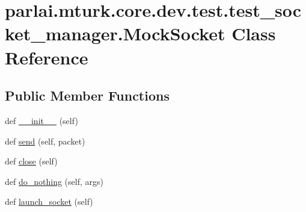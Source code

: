 \hypertarget{classparlai_1_1mturk_1_1core_1_1dev_1_1test_1_1test__socket__manager_1_1MockSocket}{}\section{parlai.\+mturk.\+core.\+dev.\+test.\+test\+\_\+socket\+\_\+manager.\+Mock\+Socket Class Reference}
\label{classparlai_1_1mturk_1_1core_1_1dev_1_1test_1_1test__socket__manager_1_1MockSocket}
\subsection*{Public Member Functions}
\begin{DoxyCompactItemize}
\item 
def \hyperlink{classparlai_1_1mturk_1_1core_1_1dev_1_1test_1_1test__socket__manager_1_1MockSocket_aae84c6558084a2a830cafc4f6954daec}{\+\_\+\+\_\+init\+\_\+\+\_\+} (self)
\item 
def \hyperlink{classparlai_1_1mturk_1_1core_1_1dev_1_1test_1_1test__socket__manager_1_1MockSocket_a16b8427d524e1681fbf16bd9f6a76ee1}{send} (self, packet)
\item 
def \hyperlink{classparlai_1_1mturk_1_1core_1_1dev_1_1test_1_1test__socket__manager_1_1MockSocket_aa0bc2ba7bc5787378324f76c4f3e4101}{close} (self)
\item 
def \hyperlink{classparlai_1_1mturk_1_1core_1_1dev_1_1test_1_1test__socket__manager_1_1MockSocket_a22ac3f879f60f110608f38e7e48c3bd1}{do\+\_\+nothing} (self, args)
\item 
def \hyperlink{classparlai_1_1mturk_1_1core_1_1dev_1_1test_1_1test__socket__manager_1_1MockSocket_abb76518775b6bd8be86b36045c7a29cd}{launch\+\_\+socket} (self)
\end{DoxyCompactItemize}
